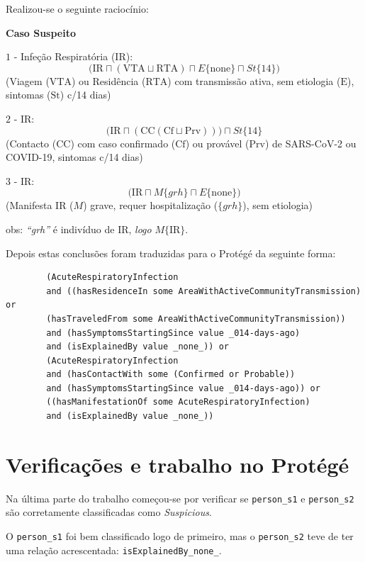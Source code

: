 Realizou-se o seguinte raciocínio:

\textbf{Caso Suspeito}

\noindent $1$ - Infeção Respiratória (IR):
\[
\big(\text{IR} \sqcap (\text{VTA} \sqcup \text{RTA}) \sqcap E\{\text{none}\} \sqcap St\{14\}\big)
\]
(Viagem ($\text{VTA}$) ou Residência ($\text{RTA}$) com transmissão ativa, sem etiologia ($\text{E}$),
sintomas ($\text{St}$) c/14 dias)

\noindent $2$ - IR:
\[
\big(\text{IR} \sqcap (\text{CC}(\text{Cf} \sqcup \text{Prv}))\big) \sqcap St\{14\}
\]
(Contacto ($\text{CC}$) com caso confirmado ($\text{Cf}$) ou provável ($\text{Prv}$) de
SARS-CoV-2 ou COVID-19, sintomas c/14 dias)

\noindent $3$ - IR:
\[
\big(\text{IR} \sqcap M\{grh\} \sqcap E\{\text{none}\}\big)
\]
(Manifesta IR ($M$) grave, requer hospitalização ($\{grh\}$), sem etiologia)

\noindent obs: \textit{``grh''} é indivíduo de $\text{IR}$, \textit{logo} $M\{\text{IR}\}$.

Depois estas conclusões foram traduzidas para o Protégé da seguinte forma:

\begin{center}
	\begin{verbatim}
		(AcuteRespiratoryInfection
		and ((hasResidenceIn some AreaWithActiveCommunityTransmission) or 
		(hasTraveledFrom some AreaWithActiveCommunityTransmission))
		and (hasSymptomsStartingSince value _014-days-ago)
		and (isExplainedBy value _none_)) or
		(AcuteRespiratoryInfection
		and (hasContactWith some (Confirmed or Probable))
		and (hasSymptomsStartingSince value _014-days-ago)) or
		((hasManifestationOf some AcuteRespiratoryInfection)
		and (isExplainedBy value _none_))
	\end{verbatim}
\end{center}

\chapter{Verificações e trabalho no Protégé}
\label{ch:prot}

Na última parte do trabalho começou-se por verificar se \texttt{person\_s1} e \texttt{person\_s2} são corretamente classificadas como \textit{Suspicious}.

O \texttt{person\_s1} foi bem classificado logo de primeiro, mas o \texttt{person\_s2} teve de ter uma relação acrescentada: \texttt{isExplainedBy{\_none\_}}.

